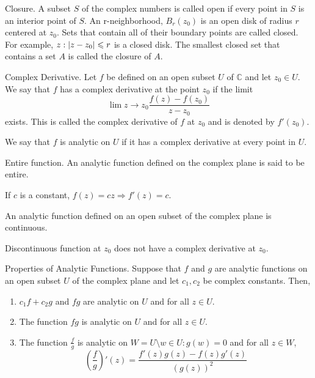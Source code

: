 \documentclass[11pt,reqno,oneside,a4paper]{article}
\begin{document}
\begin{defn}{Closure.}
A subset $S$ of the complex numbers is called open if every point in $S$ is an interior point of $S$. An r-neighborhood, $B_r(z_0)$ is an open disk of radius $r$ centered at $z_0.$ Sets that contain all of their boundary points are called closed. For example, ${z: \left\lvert z-z_0\right\rvert \leqslant r}$ is a closed disk. The smallest closed set that contains a set $A$ is called the closure of $A$.  
\end{defn}

\begin{defn}{Complex Derivative.}
Let $f$ be defined on an open subset $U$ of $\mathbb{C}$ and let $z_0 \in U.$ We say that $f$ has a complex derivative at the point $z_0$ if the limit $$\lim{z\to z_0}\frac{f(z)-f(z_0)}{z-z_0}$$ exists. This is called the complex derivative of $f$ at $z_0$ and is denoted by $f'(z_0)$.
\end{defn}
We say that $f$ is analytic on $U$ if it has a complex derivative at every point in $U$.

\begin{defn}{Entire function.}
An analytic function defined on the complex plane is said to be entire. 
\end{defn}

\begin{lem}
If $c$ is a constant, $f(z) = cz \Rightarrow f'(z) = c.$ 
\end{lem}

\begin{thm}
An analytic function defined on an open subset of the complex plane is continuous.
\end{thm}

\begin{lem}
Discontinuous function at $z_0$ does not have a complex derivative at $z_0.$
\end{lem}

\begin{thm}{Properties of Analytic Functions.}
Suppose that $f$ and $g$ are analytic functions on an open subset $U$ of the complex plane and let $c_1,c_2$ be complex constants. Then,
\begin{enumerate}
	\item $c_1f+c_2g$ and $fg$ are analytic on $U$ and for all $z \in U$.
	\item The function $fg$ is analytic on $U$ and for all $z \in U.$
	\item The function $\frac{f}{g}$ is analytic on $W = U \setminus {w\in U : g(w) = 0}$ and for all $z\in W$, 
	$$ (\frac{f}{g})'(z) = \frac{f'(z)g(z)-f(z)g'(z)}{(g(z))^2}$$
\end{enumerate}
\end{thm}
\end{document}
